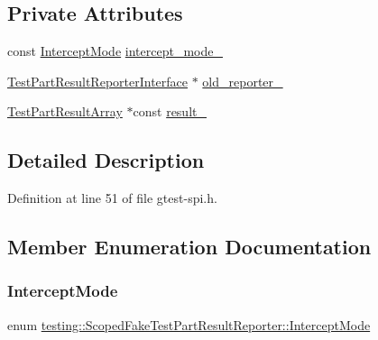 \subsection*{Private Attributes}
\begin{DoxyCompactItemize}
\item 
const \hyperlink{classtesting_1_1ScopedFakeTestPartResultReporter_a82f6209b3cf5c4b15ec8bd8041dbc2d5}{Intercept\+Mode} \hyperlink{classtesting_1_1ScopedFakeTestPartResultReporter_ae62ed825619c11ac21fdd06480e0d982}{intercept\+\_\+mode\+\_\+}
\item 
\hyperlink{classtesting_1_1TestPartResultReporterInterface}{Test\+Part\+Result\+Reporter\+Interface} $\ast$ \hyperlink{classtesting_1_1ScopedFakeTestPartResultReporter_a4183b091842a83dd8ce4927746c43092}{old\+\_\+reporter\+\_\+}
\item 
\hyperlink{classtesting_1_1TestPartResultArray}{Test\+Part\+Result\+Array} $\ast$const \hyperlink{classtesting_1_1ScopedFakeTestPartResultReporter_a729a26c94e4082ee0dc3312395a3f480}{result\+\_\+}
\end{DoxyCompactItemize}


\subsection{Detailed Description}


Definition at line 51 of file gtest-\/spi.\+h.



\subsection{Member Enumeration Documentation}
\mbox{\label{classtesting_1_1ScopedFakeTestPartResultReporter_a82f6209b3cf5c4b15ec8bd8041dbc2d5}} 
\subsubsection{\texorpdfstring{Intercept\+Mode}{InterceptMode}}
{\footnotesize\ttfamily enum \hyperlink{classtesting_1_1ScopedFakeTestPartResultReporter_a82f6209b3cf5c4b15ec8bd8041dbc2d5}{testing\+::\+Scoped\+Fake\+Test\+Part\+Result\+Reporter\+::\+Intercept\+Mode}}

